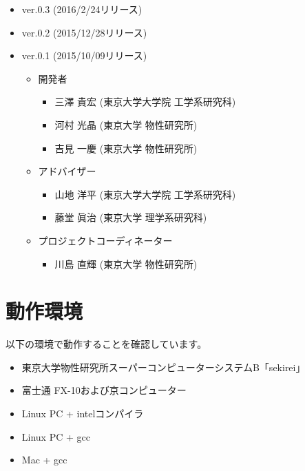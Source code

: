 \begin{itemize}
\item{ver.0.3 (2016/2/24リリース)}
\item{ver.0.2 (2015/12/28リリース)}
\item{ver.0.1 (2015/10/09リリース)}
\begin{itemize}
\item{開発者}
	\begin{itemize}
	\item{三澤 貴宏 (東京大学大学院 工学系研究科)}
	\item{河村 光晶 (東京大学 物性研究所)}
	\item{吉見 一慶 (東京大学 物性研究所)}
	\end{itemize}
\item{アドバイザー}
	\begin{itemize}
	\item{山地 洋平 (東京大学大学院 工学系研究科)}
	\item{藤堂 眞治 (東京大学 理学系研究科)}
	\end{itemize}
\item{プロジェクトコーディネーター}
	\begin{itemize}
	\item{川島 直輝 (東京大学 物性研究所)}
	\end{itemize}

\end{itemize}
\end{itemize}


\section{動作環境}
 以下の環境で動作することを確認しています。

\begin{itemize}
\item 東京大学物性研究所スーパーコンピューターシステムB「sekirei」
\item 富士通 FX-10および京コンピューター
\item Linux PC + intelコンパイラ
\item Linux PC + gcc
\item Mac + gcc
\end{itemize}
